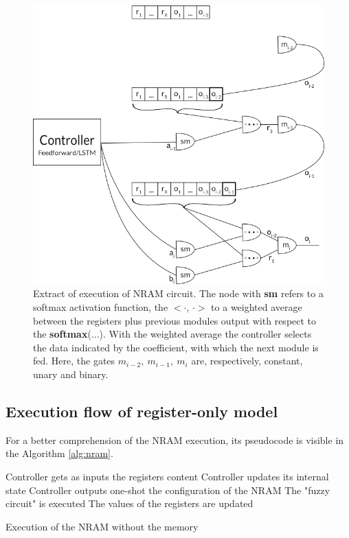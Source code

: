 \begin{figure}[h!]
	\centering
	\includegraphics[width=\textwidth]{figures/register-only-model.png}
	\caption{Extract of execution of NRAM circuit. The node with \textbf{sm} refers to a softmax activation function, the $<\cdot$, $\cdot>$ to a weighted average between the registers plus previous modules output with respect to the \textbf{softmax}($\dots$). With the weighted average the controller selects the data indicated by the coefficient, with which the next module is fed. Here, the gates $m_{i-2},\ m_{i-1},\ m_{i}$ are, respectively, constant, unary and binary.}
	\label{fig:register-only-model}
\end{figure}

\subsection{Execution flow of register-only model}\label{subsec:execution-register-only}
For a better comprehension of the NRAM execution, its pseudocode is visible in the Algorithm \ref{alg:nram}.
\begin{algorithm}
	\begin{algorithmic}[1]
		\label{lst:nram:line-5}
			\State Controller gets as inputs the registers content\label{lst:nram:line-6}
				\State Controller updates its internal state
			\EndIf
			\State Controller outputs one-shot the configuration of the NRAM 
			\label{lst:nram:line-8}
			\State The "fuzzy circuit" is executed \label{lst:nram:line-9}
			\State The values of the registers are updated\label{lst:nram:line-10}
		\EndFor
	\end{algorithmic}
	\caption{Execution of the NRAM without the memory}\label{alg:nram}
\end{algorithm}

